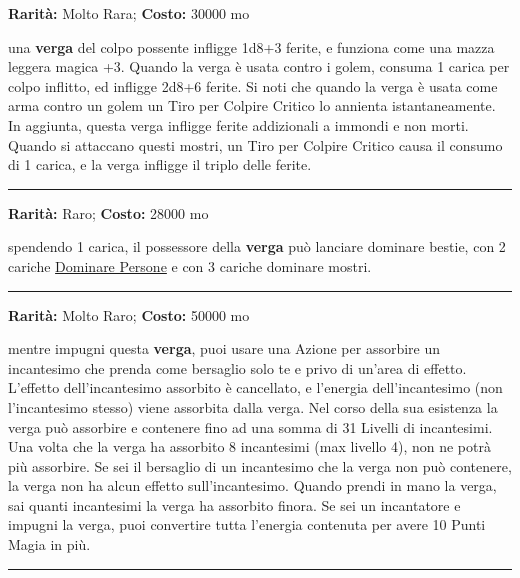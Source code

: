 \begin{multicols}{2}
\textbf{Rarità:} Molto Rara; \textbf{Costo:} 30000 mo

una \textbf{verga} del colpo possente infligge 1d8+3 ferite, e funziona come una mazza leggera magica +3. Quando la verga è usata contro i golem, consuma 1 carica per colpo inflitto, ed infligge 2d8+6 ferite. Si noti che quando la verga è usata come arma contro un golem un Tiro per Colpire Critico lo annienta istantaneamente. In aggiunta, questa verga infligge ferite addizionali a immondi e non morti. Quando si attaccano questi mostri, un Tiro per Colpire Critico causa il consumo di 1 carica, e la verga infligge il triplo delle ferite.

\smallskip\noindent\rule{\linewidth}{2pt}  \hypertarget{Vergadell'Ammaliamento}{}\smallskip{}\noindent\label{Vergadell'Ammaliamento}

\textbf{Rarità:} Raro; \textbf{Costo:} 28000 mo

spendendo 1 carica, il possessore della \textbf{verga} può lanciare dominare bestie, con 2 cariche \hyperlink{Dominare Persone}{Dominare Persone} e con 3 cariche dominare mostri.

\smallskip\noindent\rule{\linewidth}{2pt}  \hypertarget{Vergadell'Assorbimento}{}\smallskip{}\noindent\label{Vergadell'Assorbimento}

\textbf{Rarità:} Molto Raro; \textbf{Costo:} 50000 mo

mentre impugni questa \textbf{verga}, puoi usare una Azione per assorbire un incantesimo che prenda come bersaglio solo te e privo di un'area di effetto. L'effetto dell'incantesimo assorbito è cancellato, e l'energia dell'incantesimo (non l'incantesimo stesso) viene assorbita dalla verga. Nel corso della sua esistenza la verga può assorbire e contenere fino ad una somma di 31 Livelli di incantesimi. Una volta che la verga ha assorbito 8 incantesimi (max livello 4), non ne potrà più assorbire. Se sei il bersaglio di un incantesimo che la verga non può contenere, la verga non ha alcun effetto sull'incantesimo. Quando prendi in mano la verga, sai quanti incantesimi la verga ha assorbito finora. Se sei un incantatore e impugni la verga, puoi convertire tutta l'energia contenuta per avere 10 Punti Magia in più.

\smallskip\noindent\rule{\linewidth}{2pt}  \hypertarget{VergadellaForzaSovrana}{}\smallskip{}\noindent\label{VergadellaForzaSovrana}


\end{multicols}
